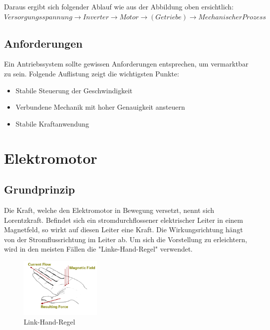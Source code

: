 Daraus ergibt sich folgender Ablauf wie aus der Abbildung oben ersichtlich:
$Versorgungsspannung \rightarrow Inverter \rightarrow Motor \rightarrow (Getriebe) \rightarrow Mechanischer Prozess$

\subsection{Anforderungen}
\label{sec:anforderungen}

Ein Antriebssystem sollte gewissen Anforderungen entsprechen, um vermarktbar zu sein. Folgende Auflistung zeigt die wichtigsten Punkte:

\begin{itemize}
\item{Stabile Steuerung der Geschwindigkeit}
\item{Verbundene Mechanik mit hoher Genauigkeit ansteuern}
\item{Stabile Kraftanwendung}
\end{itemize}

\newpage

\section{Elektromotor}
\label{sec:elektromotor}

\subsection{Grundprinzip}
\label{sec:grundprinzip}

Die Kraft, welche den Elektromotor in Bewegung versetzt, nennt sich Lorentzkraft.
Befindet sich ein stromdurchflossener elektrischer Leiter in einem Magnetfeld, so wirkt auf diesen Leiter eine Kraft.
Die Wirkungsrichtung hängt von der Stromflussrichtung im Leiter ab. 
Um sich die Vorstellung zu erleichtern, wird in den meisten Fällen die "Linke-Hand-Regel" verwendet.

\begin{figure}[!ht]
\begin{center}
	\caption{Link-Hand-Regel}
	\includegraphics[width=0.35\textwidth]{LinkehandRegel}
\end{center}
\end{figure}

